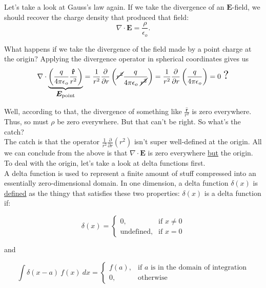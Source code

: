 \documentclass{article}
\numberwithin{equation}{section}
\newcommand{\rhat}{\mathbf{\hat{r}}}
\newcommand*{\Scale}[2][4]{\scalebox{#1}{\ensuremath{#2}}}
\begin{document}
Let's take a look at Gauss's law again. If we take the divergence of an $\bm{E}$-field, we should recover the charge density that produced that field:
\begin{equation*}
    \nabla \cdot \bm{E} = \frac{\rho}{\epsilon_o}.
\end{equation*}

What happens if we take the divergence of the field made by a point charge at the origin? Applying the divergence operator in spherical coordinates gives us
\begin{equation*}
    \nabla \cdot \underbrace{\left( \frac{q}{4\pi\epsilon_o} \frac{\rhat}{r^2} \right)}_{\displaystyle \bm{E}_{\text{point}}} = \frac{1}{r^2} \frac{\partial}{\partial r} \left( \cancel{r^2} \frac{q}{4\pi\epsilon_o\ \cancel{r^2}} \right) = \frac{1}{r^2} \frac{\partial}{\partial r} \left( \frac{q}{4\pi\epsilon_o} \right) = 0\ \Scale[1.6]{?}
\end{equation*}

Well, according to that, the divergence of something like $\displaystyle \frac{\rhat}{r^2}$ is zero everywhere. Thus, so must $\rho$ be zero everywhere. But that can't be right. So what's the catch? \\

The catch is that the operator $\displaystyle \frac{1}{r^2} \frac{\partial}{\partial r} \left( r^2 \right)$ isn't super well-defined at the origin. All we can conclude from the above is that $\nabla \cdot \bm{E}$ is zero everywhere \underline{but} the origin. To deal with the origin, let's take a look at delta functions first. \\

A delta function is used to represent a finite amount of stuff compressed into an essentially zero-dimensional domain. In one dimension, a delta function $\delta(x)$ is \underline{defined} as the thingy that satisfies these two properties: $\delta(x)$ is a delta function if:

\begin{equation*}
    \displaystyle \delta(x) = \begin{cases} \displaystyle 0, & \text{if } x \neq 0 \\ \displaystyle \text{undefined}, & \text{if } x = 0 \end{cases}
\end{equation*}

and

\begin{equation*}
    \displaystyle \int \delta(x - a)\ f(x)\ dx = \begin{cases} \displaystyle f(a), & \text{if } a \text{ is in the domain of integration} \\ \displaystyle 0, & \text{otherwise} \end{cases}
\end{equation*}
\end{document}
